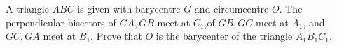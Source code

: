 A triangle $ABC$ is given with barycentre $G$ and circumcentre $O$. The perpendicular bisectors of $GA, GB$ meet at $C_1$,of $GB,GC$ meet at $A _1$, and $GC,GA$ meet at $B_1$. Prove that $O$ is the barycenter of the triangle $A_1B_1C_1$.
